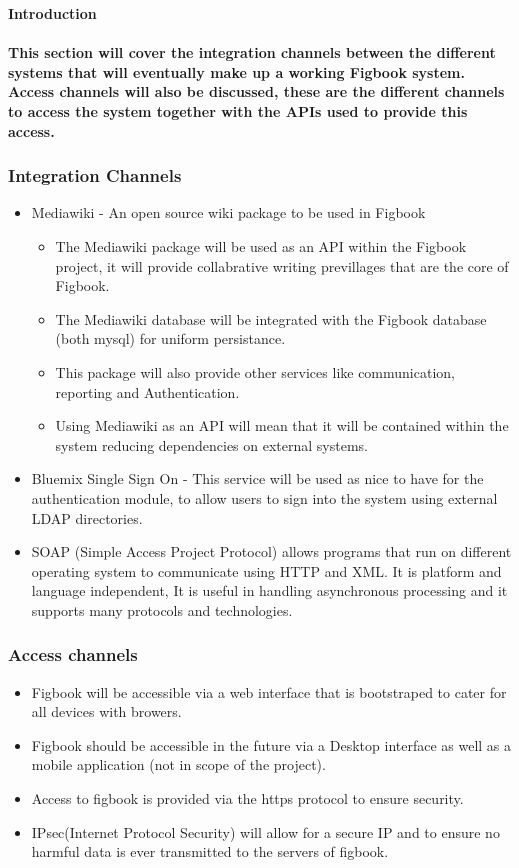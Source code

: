 

\textbf{Introduction}\paragraph{This section will cover the integration channels between the different systems that will eventually make up a working Figbook system.
Access channels will also be discussed, these are the different channels to access the system together with the APIs used to provide this access. } 

\subsubsection{Integration Channels}
\begin{itemize}
\item Mediawiki - An open source wiki package to be used in Figbook
\begin{itemize}
\item The Mediawiki package will be used as an API within the Figbook project, it will provide collabrative writing previllages that are the core of Figbook.
\item The Mediawiki database will be integrated with the Figbook database (both mysql) for uniform persistance.
\item This package will also provide other services like communication, reporting and Authentication.
\item Using Mediawiki as an API will mean that it will be contained within the system reducing dependencies on external systems.
\end{itemize}
\item Bluemix Single Sign On - This service will be used as nice to have for the authentication module, to allow users to sign into the system using external LDAP directories.
\item SOAP (Simple Access Project Protocol) allows programs that run on different operating system to communicate using HTTP and XML. It is platform and language independent, It is useful in handling asynchronous processing and it supports many protocols and technologies.
\end{itemize}
\subsubsection{Access channels}
\begin{itemize}
\item Figbook will be accessible via a web interface that is bootstraped to cater for all devices with browers.
\item Figbook should be accessible in the future via a Desktop interface as well as a mobile application (not in scope of the project).
\item Access to figbook is provided via the https protocol to ensure security.
\item IPsec(Internet Protocol Security) will allow for a secure IP and to ensure no harmful data is ever transmitted to the servers of figbook.
\end{itemize}

